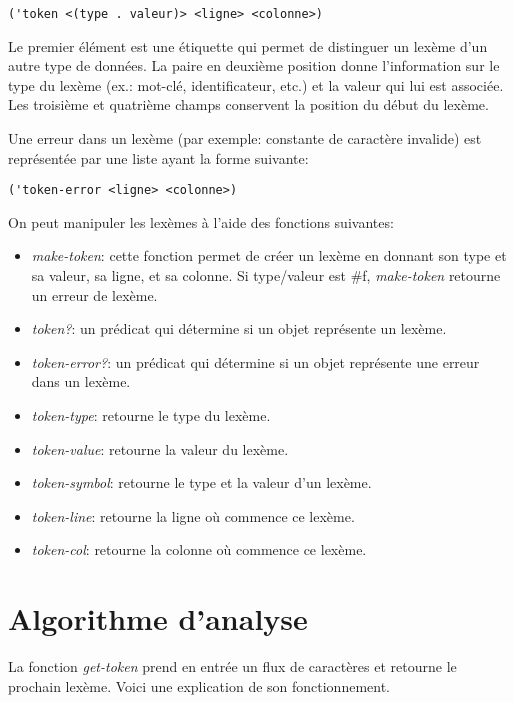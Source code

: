 \documentclass[11pt]{report}
\begin{document}
\begin{verbatim}
('token <(type . valeur)> <ligne> <colonne>)
\end{verbatim}

Le premier élément est une étiquette qui permet de distinguer un
lexème d'un autre type de données.  La paire en deuxième position
donne l'information sur le type du lexème (ex.: mot-clé,
identificateur, etc.) et la valeur qui lui est associée.  Les
troisième et quatrième champs conservent la position du début du
lexème.

Une erreur dans un lexème (par exemple: constante de caractère
invalide) est représentée par une liste ayant la forme suivante:

\begin{verbatim}
('token-error <ligne> <colonne>)
\end{verbatim}


On peut manipuler les lexèmes à l'aide des fonctions suivantes:

\begin{itemize}
\item \emph{make-token}: cette fonction permet de créer un lexème en
  donnant son type et sa valeur, sa ligne, et sa colonne.  Si
  type/valeur est \#f, \emph{make-token} retourne un erreur de lexème.
\item \emph{token?}: un prédicat qui détermine si un objet représente
  un lexème.
\item \emph{token-error?}: un prédicat qui détermine si un objet
  représente une erreur dans un lexème.
\item \emph{token-type}: retourne le type du lexème.
\item \emph{token-value}: retourne la valeur du lexème.
\item \emph{token-symbol}: retourne le type et la valeur d'un lexème.
\item \emph{token-line}: retourne la ligne où commence ce lexème.
\item \emph{token-col}: retourne la colonne où commence ce lexème.
\end{itemize}

\section{Algorithme d'analyse}

La fonction \emph{get-token} prend en entrée un flux de caractères et
retourne le prochain lexème.  Voici une explication de son
fonctionnement.
\end{document}
